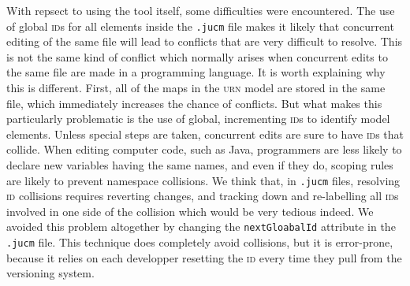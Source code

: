\documentclass[10pt,fleqn]{article}
\begin{document}
	With repsect to using the tool itself, some difficulties were encountered.
	The use of global \textsc{id}s for all elements inside the \texttt{.jucm} 
	file makes it 
	likely that concurrent editing of the same file will lead to conflicts
	that are very difficult to resolve.  This is not the same kind of conflict
	which normally arises when concurrent edits to the same file are made in
	a programming language.  It is worth explaining why this is different.  
	First, all of the maps in the \textsc{urn} model are stored in the same 
	file, which
	immediately increases the chance of conflicts.  But what makes this
	particularly problematic is the use of global, incrementing \textsc{id}s 
	to identify model elements.  Unless special steps are taken, 
	concurrent edits are sure to have \textsc{id}s that collide.  When
	editing computer code, such as Java,  programmers are 
	less likely to declare new variables having the same names, and even if
	they do, scoping rules are likely to prevent namespace collisions.  
	We think that, in \texttt{.jucm} files, resolving \textsc{id} collisions 
	requires 
	reverting changes, and tracking down and re-labelling all \textsc{id}s 
	involved in 
	one side of the collision which would be very tedious indeed.  We avoided 
	this problem altogether by changing the 
	\texttt{nextGloabalId} attribute in the \texttt{.jucm} file.  This 
	technique does completely avoid collisions, but it is error-prone, 
	because it relies on each developper resetting the \textsc{id} every time they pull
	from the versioning system.

	
\end{document}
